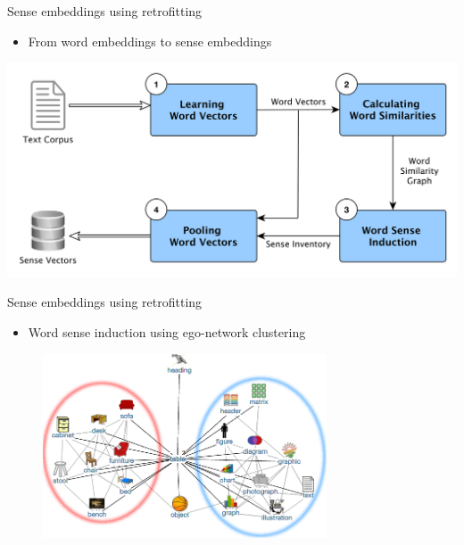 \begin{frame}{Sense embeddings using retrofitting}
\begin{itemize}
\item From word embeddings to sense embeddings
\end{itemize}
\includegraphics[width=\textwidth]{pipeline}

\end{frame}



\begin{frame}{Sense embeddings using retrofitting}

\begin{itemize}
\item Word sense induction using  ego-network clustering
\end{itemize} 
	
\centering
\begin{figure}
\includegraphics[width=0.75\textwidth]{table}
\end{figure}

\end{frame}


